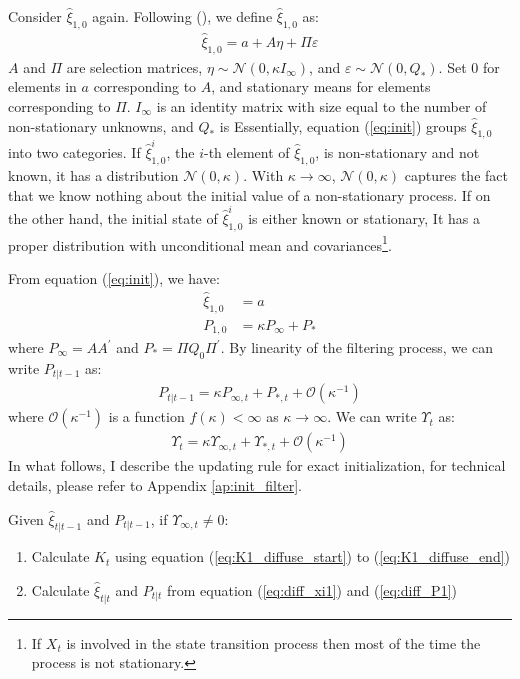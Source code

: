 \documentclass[12pt]{article}
\newenvironment{boenumerate}
    {\begin{enumerate}\renewcommand\labelenumi{\textbf\theenumi}}
    {\end{enumerate}}
\numberwithin{equation}{section}
\begin{document}
Consider $\hat{\xi}_{1,0}$ again. Following (\cite{koopman_1997}), we define $\hat{\xi}_{1,0}$ as:
\begin{align}
    \hat{\xi}_{1,0} = a + A\eta + \Pi\varepsilon \label{eq:init}
\end{align}
$A$ and $\Pi$ are selection matrices, $\eta\sim\mathcal{N}(0,\kappa I_{\infty})$, and $\varepsilon\sim\mathcal{N}(0,Q_{*})$. Set $0$ for elements in $a$ corresponding to $A$, and stationary means for elements corresponding to $\Pi$. $I_{\infty}$ is an identity matrix with size equal to the number of non-stationary unknowns, and $Q_{*}$ is Essentially, equation (\ref{eq:init}) groups $\hat{\xi}_{1,0}$ into two categories. If $\hat{\xi}_{1,0}^i$, the $i$-th element of $\hat{\xi}_{1,0}$, is non-stationary and not known, it has a distribution $\mathcal{N}(0, \kappa)$. With $\kappa\rightarrow\infty$, $\mathcal{N}(0,\kappa)$ captures the fact that we know nothing about the initial value of a non-stationary process. If on the other hand, the initial state of $\hat{\xi}_{1,0}^i$ is either known or stationary, It has a proper distribution with unconditional mean and covariances\footnote{If $X_t$ is involved in the state transition process then most of the time the process is not stationary.}. 

From equation (\ref{eq:init}), we have:
\begin{align}
    \hat{\xi}_{1,0} &= a  \label{eq:init_xi}\\
    P_{1,0} &= \kappa P_{\infty} + P_{*} \label{eq:init_P}
\end{align}
where $P_{\infty}=AA^{'}$ and $P_{*}=\Pi Q_0 \Pi^{'}$. By linearity of the filtering process, we can write $P_{t|t-1}$ as:
\begin{align}
    P_{t|t-1} = \kappa P_{\infty,t} + P_{*,t} + \mathcal{O}(\kappa^{-1}) \label{eq:P_diffuse}
\end{align}
where $\mathcal{O}(\kappa^{-1})$ is a function $f(\kappa)<\infty$ as $\kappa\rightarrow\infty$. We can write $\Upsilon_{t}$ as:
\begin{align*}
    \Upsilon_t = \kappa\Upsilon_{\infty,t} + \Upsilon_{*,t} + \mathcal{O}(\kappa^{-1})
\end{align*}
In what follows, I describe the updating rule for exact initialization, for technical details, please refer to Appendix \ref{ap:init_filter}.

Given $\hat{\xi}_{t|t-1}$ and $P_{t|t-1}$, if $\Upsilon_{\infty,t}\neq 0$:
\begin{boenumerate}
    \item Calculate $K_t$ using equation (\ref{eq:K1_diffuse_start}) to (\ref{eq:K1_diffuse_end})
    \item Calculate $\hat{\xi}_{t|t}$ and $P_{t|t}$ from equation (\ref{eq:diff_xi1}) and (\ref{eq:diff_P1})
\end{boenumerate}
\end{document}
